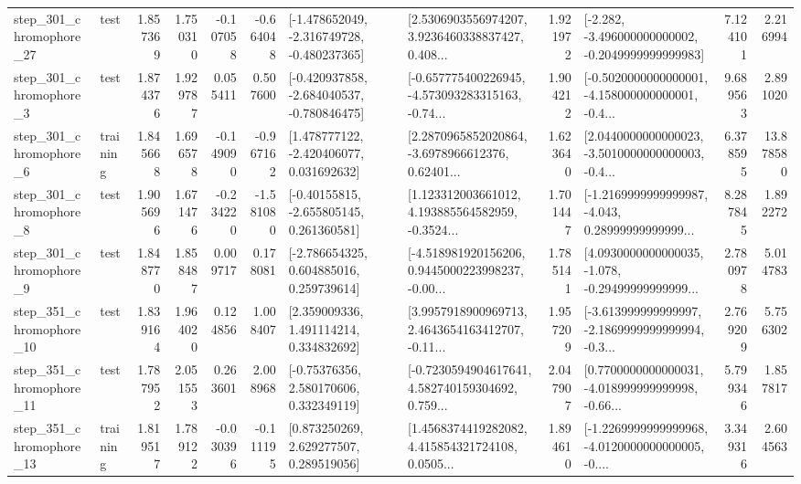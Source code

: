 \begin{tabular}{llrrrrllrlrr}
  step\_301\_chromophore\_27 &      test &      1.857369 &    1.750310 &     -0.107058 & -0.664048 &  [-1.478652049, -2.316749728, -0.480237365] &  [2.5306903556974207, 3.9236460338837427, 0.408... &       1.921972 &  [-2.282, -3.496000000000002, -0.2049999999999983] &            7.124101 &          2.216994 \\
   step\_301\_chromophore\_3 &      test &      1.874376 &    1.929787 &      0.055411 &  0.507600 &  [-0.420937858, -2.684040537, -0.780846475] &  [-0.657775400226945, -4.573093283315163, -0.74... &       1.904212 &  [-0.5020000000000001, -4.158000000000001, -0.4... &            9.689563 &          2.891020 \\
   step\_301\_chromophore\_6 &  training &      1.845668 &    1.696578 &     -0.149090 & -0.967162 &    [1.478777122, -2.420406077, 0.031692632] &  [2.2870965852020864, -3.6978966612376, 0.62401... &       1.623640 &  [2.0440000000000023, -3.5010000000000003, -0.4... &            6.378595 &         13.878580 \\
   step\_301\_chromophore\_8 &      test &      1.905696 &    1.671476 &     -0.234220 & -1.581080 &    [-0.40155815, -2.655805145, 0.261360581] &  [1.123312003661012, 4.193885564582959, -0.3524... &       1.701447 &  [-1.2169999999999987, -4.043, 0.28999999999999... &            8.287845 &          1.892272 \\
   step\_301\_chromophore\_9 &      test &      1.848770 &    1.858487 &      0.009717 &  0.178081 &    [-2.786654325, 0.604885016, 0.259739614] &  [-4.518981920156206, 0.9445000223998237, -0.00... &       1.785141 &  [4.0930000000000035, -1.078, -0.29499999999999... &            2.780978 &          5.014783 \\
  step\_351\_chromophore\_10 &      test &      1.839164 &    1.964020 &      0.124856 &  1.008407 &     [2.359009336, 1.491114214, 0.334832692] &  [3.9957918900969713, 2.4643654163412707, -0.11... &       1.957209 &  [-3.613999999999997, -2.1869999999999994, -0.3... &            2.769209 &          5.756302 \\
  step\_351\_chromophore\_11 &      test &      1.787952 &    2.051553 &      0.263601 &  2.008968 &     [-0.75376356, 2.580170606, 0.332349119] &  [-0.7230594904617641, 4.582740159304692, 0.759... &       2.047907 &  [0.7700000000000031, -4.018999999999998, -0.66... &            5.799346 &          1.857817 \\
  step\_351\_chromophore\_13 &  training &      1.819517 &    1.789122 &     -0.030396 & -0.111195 &     [0.873250269, 2.629277507, 0.289519056] &  [1.4568374419282082, 4.415854321724108, 0.0505... &       1.894610 &  [-1.2269999999999968, -4.0120000000000005, -0.... &            3.349316 &          2.604563 \\

\end{tabular}
